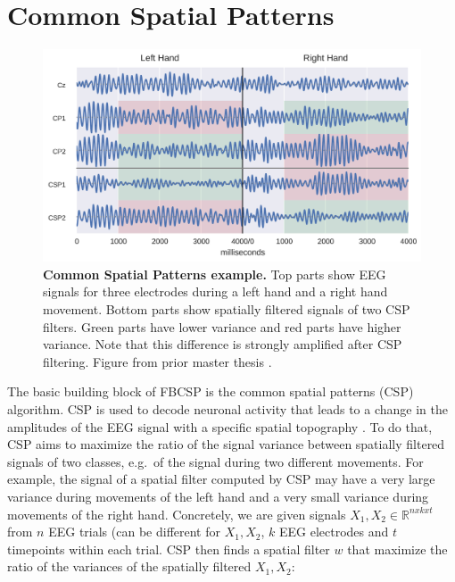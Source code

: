 \section{Common Spatial Patterns}\label{common-spatial-patterns}


\begin{figure}[ht]
    \myfloatalign
    \includegraphics[width=1\linewidth]{images/Methods_Common_Spatial_Patterns_18_0.png}
    \caption[Common Spatial Patterns example.]{
\textbf{Common Spatial Patterns example.} Top parts show EEG
signals for three electrodes during a left hand and a right hand
movement. Bottom parts show spatially filtered signals of two CSP
filters. Green parts have lower variance and red parts have higher
variance. Note that this difference is strongly amplified after CSP
filtering. Figure from prior master thesis
\citep{schirrmeister_msc_thesis_2015}.}\label{csp-figure}
\end{figure}


    The basic building block of FBCSP is the common spatial patterns (CSP)
algorithm. CSP is used to decode neuronal activity that leads to a
change in the amplitudes of the EEG signal with a specific spatial
topography \citep{koles_spatial_1990,ramoser_optimal_2000,blankertz_optimizing_2008}.
To do that, CSP aims to maximize the ratio of the signal variance
between spatially filtered signals of two classes, e.g.~of the signal
during two different movements. For example, the signal of a spatial
filter computed by CSP may have a very large variance during movements
of the left hand and a very small variance during movements of the right
hand. Concretely, we are given signals
$X_{1}, X_{2} \in \mathbb{R}^{n x k x t}$ from $n$ EEG trials (can
be different for $X_1, X_2$, $k$ EEG electrodes and $t$
timepoints within each trial. CSP then finds a spatial filter $w$ that
maximize the ratio of the variances of the spatially filtered
$X_1,X_2$:

